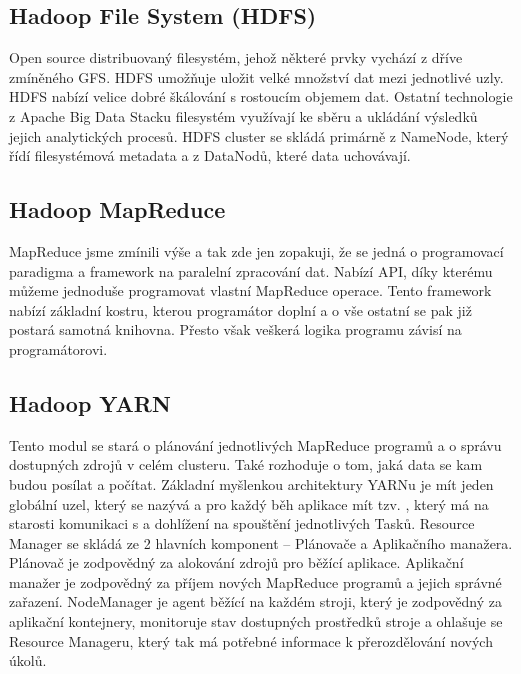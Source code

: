 \subsection{Hadoop File System (HDFS)}
Open source distribuovaný filesystém, jehož některé prvky vychází z dříve zmíněného GFS. HDFS umožňuje uložit velké množství dat mezi jednotlivé uzly. HDFS nabízí velice dobré škálování s rostoucím objemem dat. Ostatní technologie z Apache Big Data Stacku filesystém využívají ke sběru a ukládání výsledků jejich analytických procesů. HDFS cluster se skládá primárně z NameNode, který řídí filesystémová metadata a z DataNodů, které data uchovávají. 

\subsection{Hadoop MapReduce}
MapReduce jsme zmínili výše a tak zde jen zopakuji, že se jedná o programovací paradigma a framework na paralelní zpracování dat. Nabízí API, díky kterému můžeme jednoduše programovat vlastní MapReduce operace. Tento framework nabízí základní kostru, kterou programátor doplní a o vše ostatní se pak již postará samotná knihovna. Přesto však veškerá logika programu závisí na programátorovi. 

\subsection{Hadoop YARN}
Tento modul se stará o plánování jednotlivých MapReduce programů a o správu dostupných zdrojů v celém clusteru. Také rozhoduje o tom, jaká data se kam budou posílat a počítat. Základní myšlenkou architektury YARNu je mít jeden globální uzel, který se nazývá  a pro každý běh aplikace mít tzv. , který má na starosti komunikaci s  a dohlížení na spouštění jednotlivých Tasků. Resource Manager se skládá ze 2 hlavních komponent – Plánovače a Aplikačního manažera. Plánovač je zodpovědný za alokování zdrojů pro běžící aplikace. Aplikační manažer je zodpovědný za příjem nových MapReduce programů a jejich správné zařazení. NodeManager je agent běžící na každém stroji, který je zodpovědný za aplikační kontejnery, monitoruje stav dostupných prostředků stroje a ohlašuje se Resource Manageru, který tak má potřebné informace k přerozdělování nových úkolů.

